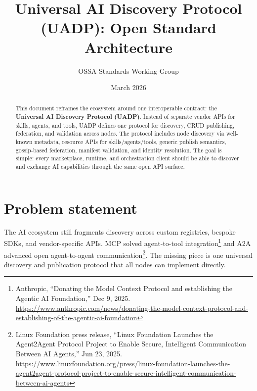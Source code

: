 \documentclass[11pt]{article}
\title{Universal AI Discovery Protocol (UADP): Open Standard Architecture}
\author{OSSA Standards Working Group}
\date{March 2026}
\newcommand{\citeoci}{}
\newcommand{\citesigstore}{}
\newcommand{\citeslsa}{}
\newcommand{\citespiffe}{}
\newcommand{\citecloudevents}{}
\newcommand{\citenats}{}
\newcommand{\citedeepresearch}{}
\newcommand{\citebedrockagentcore}{}
\newcommand{\citedatabricksassistant}{}
\newcommand{\citelanggraphref}{}
\newcommand{\citeaifoundry}{}
\begin{document}
\maketitle

\renewcommand{\citeoci}{\textsuperscript{[OCI]}}
\renewcommand{\citesigstore}{\textsuperscript{[Sigstore]}}
\renewcommand{\citeslsa}{\textsuperscript{[SLSA]}}
\renewcommand{\citespiffe}{\textsuperscript{[SPIFFE]}}
\renewcommand{\citecloudevents}{\textsuperscript{[CloudEvents]}}
\renewcommand{\citenats}{\textsuperscript{[NATS]}}
\renewcommand{\citedeepresearch}{\textsuperscript{[DeepResearch]}}
\renewcommand{\citebedrockagentcore}{\textsuperscript{[BedrockAgentCore]}}
\renewcommand{\citedatabricksassistant}{\textsuperscript{[DatabricksAssistant]}}
\renewcommand{\citelanggraphref}{\textsuperscript{[LangGraph101]}}
\renewcommand{\citeaifoundry}{\textsuperscript{[AIFoundry]}}
\begin{abstract}
  This document reframes the ecosystem around one interoperable contract: the \textbf{Universal AI Discovery Protocol (UADP)}. Instead of separate vendor APIs for skills, agents, and tools, UADP defines one protocol for discovery, CRUD publishing, federation, and validation across nodes. The protocol includes node discovery via well-known metadata, resource APIs for skills/agents/tools, generic publish semantics, gossip-based federation, manifest validation, and identity resolution. The goal is simple: every marketplace, runtime, and orchestration client should be able to discover and exchange AI capabilities through the same open API surface.
\end{abstract}

\ignorespaces

\tableofcontents

\section{Problem statement}
The AI ecosystem still fragments discovery across custom registries, bespoke SDKs, and vendor-specific APIs. MCP solved agent-to-tool integration\footnote{Anthropic, ``Donating the Model Context Protocol and establishing the Agentic AI Foundation,'' Dec 9, 2025. \url{https://www.anthropic.com/news/donating-the-model-context-protocol-and-establishing-of-the-agentic-ai-foundation}} and A2A advanced open agent-to-agent communication\footnote{Linux Foundation press release, ``Linux Foundation Launches the Agent2Agent Protocol Project to Enable Secure, Intelligent Communication Between AI Agents,'' Jun 23, 2025. \url{https://www.linuxfoundation.org/press/linux-foundation-launches-the-agent2agent-protocol-project-to-enable-secure-intelligent-communication-between-ai-agents}}. The missing piece is one universal discovery and publication protocol that all nodes can implement directly.
\end{document}
